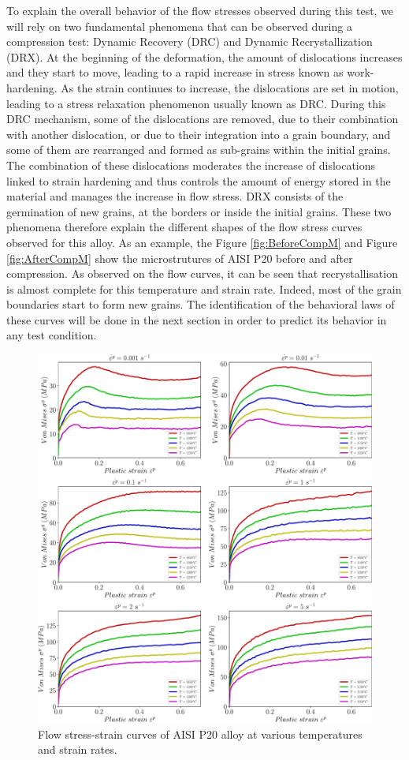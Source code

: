 \documentclass[twoside,english,1p,final,sort&compress]{elsarticle}
\theoremstyle{plain}
\begin{document}
To explain the overall behavior of the flow stresses observed during this test, we will rely on two fundamental phenomena that can be observed during a compression test: Dynamic Recovery (DRC) and Dynamic Recrystallization (DRX). At the beginning of the deformation, the amount of dislocations increases and they start to move, leading to a rapid increase in stress known as work-hardening. As the strain continues to increase, the dislocations are set in motion, leading to a stress relaxation phenomenon usually known as DRC. During this DRC mechanism, some of the dislocations are removed, due to their combination with another dislocation, or due to their integration into a grain boundary, and some of them are rearranged and formed as sub-grains within the initial grains. The combination of these dislocations moderates the increase of dislocations linked to strain hardening and thus controls the amount of energy stored in the material and manages the increase in flow stress. DRX consists of the germination of new grains, at the borders or inside the initial grains. These two phenomena therefore explain the different shapes of the flow stress curves observed for this alloy. As an example, the Figure \ref{fig:BeforeCompM} and Figure \ref{fig:AfterCompM} show the microstrutures of AISI P20 before and after compression. As observed on the flow curves, it can be seen that recrystallisation is almost complete for this temperature and strain rate. Indeed, most of the grain boundaries start to form new grains. The identification of the behavioral laws of these curves will be done in the next section in order to predict its behavior in any test condition.
\begin{figure}[!ht]
\centering
\includegraphics[width=1.02\columnwidth]
{Figures/rawData}
\caption{Flow stress-strain curves of AISI P20 alloy at various temperatures and strain rates.}
\label{fig:rawData}
\end{figure}
\end{document}
